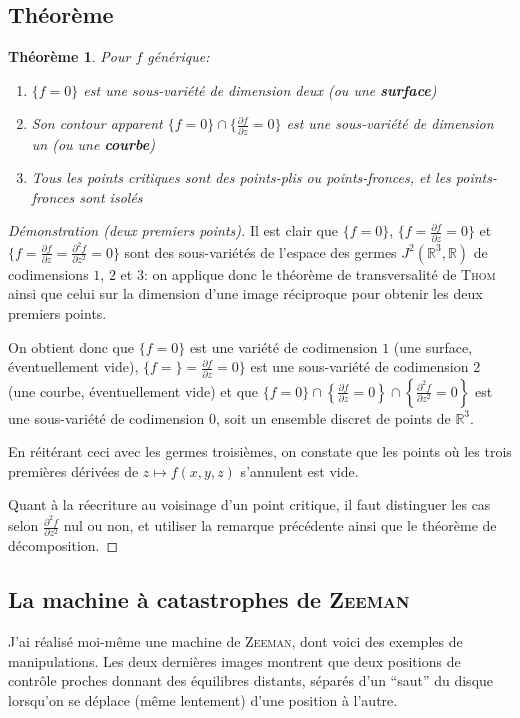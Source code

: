 \documentclass[a4paper]{article}
\newcommand{\R}{\mathbb{R}}
\newtheorem{thm}{Théorème}
\theoremstyle{definition}
\begin{document}
\subsection{Théorème}
\setcounter{thm}{6}
\begin{thm}
	Pour $f$ générique:
	\begin{enumerate}
		\item $\{f=0\}$ est une sous-variété de dimension deux (ou une \textbf{surface})
		\item Son contour apparent $\{f=0\}\cap \{\frac{\partial f}{\partial z}=0\}$ est une sous-variété de dimension un (ou une \textbf{courbe})
		\item Tous les points critiques sont des points-plis ou points-fronces, et les points-fronces sont isolés
	\end{enumerate}
\end{thm}
\begin{proof}[Démonstration (deux premiers points)]
	Il est clair que $\{f=0\}$, $\{f=\frac{\partial f}{\partial z}=0\}$ et $\{f=\frac{\partial f}{\partial z}=\frac{\partial^2 f}{\partial z^2}=0\}$ sont des sous-variétés de l'espace des germes $J^2(\R^3,\R)$ de codimensions $1$, $2$ et $3$: on applique donc le théorème de transversalité de \textsc{Thom} ainsi que celui sur la dimension d'une image réciproque pour obtenir les deux premiers points.

	On obtient donc que $\{f=0\}$ est une variété de codimension $1$ (une surface, éventuellement vide), $\{f=\}=\frac{\partial f}{\partial z}=0\}$ est une sous-variété de codimension $2$ (une courbe, éventuellement vide) et que $\{f=0 \} \cap \left\{\frac{\partial f}{\partial z}=0\right\} \cap \left\{\frac{\partial^2 f}{\partial z^2}=0\right\}$ est une sous-variété de codimension $0$, soit un ensemble discret de points de $\R^3$.

	En réitérant ceci avec les germes troisièmes, on constate que les points où les trois premières dérivées de $z \mapsto f(x,y,z)$ s'annulent est vide.

	Quant à la réecriture au voisinage d'un point critique, il faut distinguer les cas selon $\frac{\partial^2 f}{\partial z^2}$ nul ou non, et utiliser la remarque précédente ainsi que le théorème de décomposition.
\end{proof}

\subsection{La machine à catastrophes de \textsc{Zeeman}}
J'ai réalisé moi-même une machine de \textsc{Zeeman}, dont voici des exemples de manipulations.
Les deux dernières images montrent que deux positions de contrôle proches donnant des équilibres distants, séparés d'un ``saut'' du disque lorsqu'on se déplace (même lentement) d'une position à l'autre.
\end{document}
